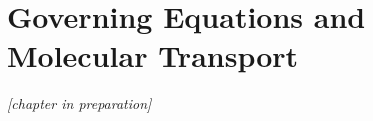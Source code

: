 \chapter{Governing Equations and Molecular Transport}\label{ch:governing}

\emph{[chapter in preparation]}
